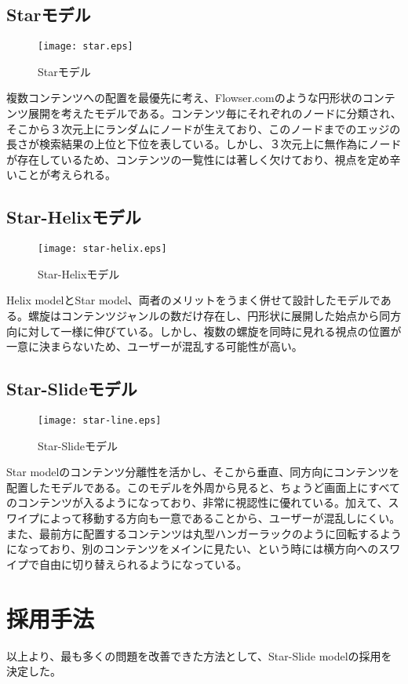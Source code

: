 \subsection{Starモデル}
\begin{figure}[htbp]
\begin{center}
\texttt{[image: star.eps]}
\caption{Starモデル}
\label{star}
\end{center}
\end{figure}
複数コンテンツへの配置を最優先に考え、Flowser.comのような円形状のコンテンツ展開を考えたモデルである。コンテンツ毎にそれぞれのノードに分類され、そこから３次元上にランダムにノードが生えており、このノードまでのエッジの長さが検索結果の上位と下位を表している。しかし、３次元上に無作為にノードが存在しているため、コンテンツの一覧性には著しく欠けており、視点を定め辛いことが考えられる。

\subsection{Star-Helixモデル}
\begin{figure}[htbp]
\begin{center}
\texttt{[image: star-helix.eps]}
\caption{Star-Helixモデル}
\label{star-helix}
\end{center}
\end{figure}
Helix modelとStar model、両者のメリットをうまく併せて設計したモデルである。螺旋はコンテンツジャンルの数だけ存在し、円形状に展開した始点から同方向に対して一様に伸びている。しかし、複数の螺旋を同時に見れる視点の位置が一意に決まらないため、ユーザーが混乱する可能性が高い。

\subsection{Star-Slideモデル}
\begin{figure}[htbp]
\begin{center}
\texttt{[image: star-line.eps]}
\caption{Star-Slideモデル}
\label{star-line}
\end{center}
\end{figure}
Star modelのコンテンツ分離性を活かし、そこから垂直、同方向にコンテンツを配置したモデルである。このモデルを外周から見ると、ちょうど画面上にすべてのコンテンツが入るようになっており、非常に視認性に優れている。加えて、スワイプによって移動する方向も一意であることから、ユーザーが混乱しにくい。また、最前方に配置するコンテンツは丸型ハンガーラックのように回転するようになっており、別のコンテンツをメインに見たい、という時には横方向へのスワイプで自由に切り替えられるようになっている。

\section{採用手法}
以上より、最も多くの問題を改善できた方法として、Star-Slide modelの採用を決定した。